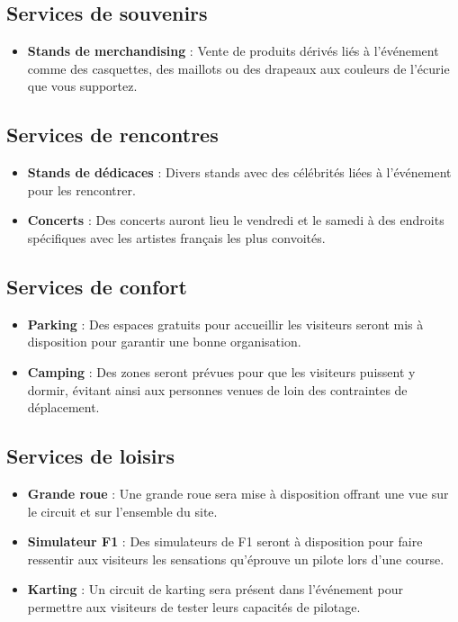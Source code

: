 \documentclass[12pt,a4paper]{article}
\begin{document}
\subsection{Services de souvenirs}

\begin{itemize}
    \item \textbf{Stands de merchandising} : Vente de produits dérivés liés à l'événement comme des casquettes, des maillots ou des drapeaux aux couleurs de l'écurie que vous supportez.
\end{itemize}

\subsection{Services de rencontres}

\begin{itemize}
    \item \textbf{Stands de dédicaces} : Divers stands avec des célébrités liées à l'événement pour les rencontrer.
    
    \item \textbf{Concerts} : Des concerts auront lieu le vendredi et le samedi à des endroits spécifiques avec les artistes français les plus convoités.
\end{itemize}

\subsection{Services de confort}

\begin{itemize}
    \item \textbf{Parking} : Des espaces gratuits pour accueillir les visiteurs seront mis à disposition pour garantir une bonne organisation.
    
    \item \textbf{Camping} : Des zones seront prévues pour que les visiteurs puissent y dormir, évitant ainsi aux personnes venues de loin des contraintes de déplacement.
\end{itemize}

\subsection{Services de loisirs}

\begin{itemize}
    \item \textbf{Grande roue} : Une grande roue sera mise à disposition offrant une vue sur le circuit et sur l'ensemble du site.
    
    \item \textbf{Simulateur F1} : Des simulateurs de F1 seront à disposition pour faire ressentir aux visiteurs les sensations qu'éprouve un pilote lors d'une course.
    
    \item \textbf{Karting} : Un circuit de karting sera présent dans l'événement pour permettre aux visiteurs de tester leurs capacités de pilotage.
\end{itemize}
\end{document}
